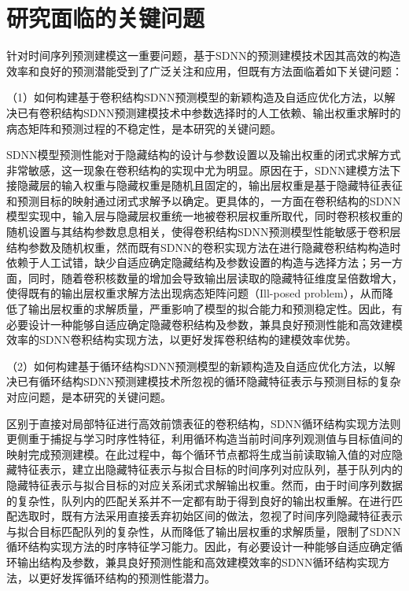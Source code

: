 \section{研究面临的关键问题}

针对时间序列预测建模这一重要问题，基于SDNN的预测建模技术因其高效的构造效率和良好的预测潜能受到了广泛关注和应用，但既有方法面临着如下关键问题：

（1）如何构建基于卷积结构SDNN预测模型的新颖构造及自适应优化方法，以解决已有卷积结构SDNN预测建模技术中参数选择时的人工依赖、输出权重求解时的病态矩阵和预测过程的不稳定性，是本研究的关键问题。

SDNN模型预测性能对于隐藏结构的设计与参数设置以及输出权重的闭式求解方式非常敏感，这一现象在卷积结构的实现中尤为明显。原因在于，SDNN建模方法下接隐藏层的输入权重与隐藏权重是随机且固定的，输出层权重是基于隐藏特征表征和预测目标的映射通过闭式求解予以确定。更具体的，一方面在卷积结构的SDNN模型实现中，输入层与隐藏层权重统一地被卷积层权重所取代，同时卷积核权重的随机设置与其结构参数息息相关，使得卷积结构SDNN预测模型性能敏感于卷积层结构参数及随机权重，然而既有SDNN的卷积实现方法在进行隐藏卷积结构构造时依赖于人工试错，缺少自适应确定隐藏结构及参数设置的构造与选择方法；另一方面，同时，随着卷积核数量的增加会导致输出层读取的隐藏特征维度呈倍数增大，使得既有的输出层权重求解方法出现病态矩阵问题（Ill-posed problem），从而降低了输出层权重的求解质量，严重影响了模型的拟合能力和预测稳定性。因此，有必要设计一种能够自适应确定隐藏卷积结构及参数，兼具良好预测性能和高效建模效率的SDNN卷积结构实现方法，以更好发挥卷积结构的建模效率优势。


（2）如何构建基于循环结构SDNN预测模型的新颖构造及自适应优化方法，以解决已有循环结构SDNN预测建模技术所忽视的循环隐藏特征表示与预测目标的复杂对应问题，是本研究的关键问题。

区别于直接对局部特征进行高效前馈表征的卷积结构，SDNN循环结构实现方法则更侧重于捕捉与学习时序性特征，利用循环构造当前时间序列观测值与目标值间的映射完成预测建模。在此过程中，每个循环节点都将生成当前读取输入值的对应隐藏特征表示，建立出隐藏特征表示与拟合目标的时间序列对应队列，基于队列内的隐藏特征表示与拟合目标的对应关系闭式求解输出权重。然而，由于时间序列数据的复杂性，队列内的匹配关系并不一定都有助于得到良好的输出权重解。在进行匹配选取时，既有方法采用直接丢弃初始区间的做法，忽视了时间序列隐藏特征表示与拟合目标匹配队列的复杂性，从而降低了输出层权重的求解质量，限制了SDNN循环结构实现方法的时序特征学习能力。因此，有必要设计一种能够自适应确定循环输出结构及参数，兼具良好预测性能和高效建模效率的SDNN循环结构实现方法，以更好发挥循环结构的预测性能潜力。

